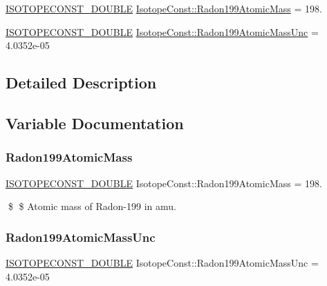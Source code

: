 \begin{DoxyCompactItemize}
\item 
\mbox{\hyperlink{group___isotope_const-_macros_ga8f45a7272ce02c0b4c65c44636ed719a}{I\+S\+O\+T\+O\+P\+E\+C\+O\+N\+S\+T\+\_\+\+D\+O\+U\+B\+LE}} \mbox{\hyperlink{group___isotope_const-_radon-_rn199_ga08ef0f195014e412578e8e9b1a482140}{Isotope\+Const\+::\+Radon199\+Atomic\+Mass}} = 198.
\item 
\mbox{\hyperlink{group___isotope_const-_macros_ga8f45a7272ce02c0b4c65c44636ed719a}{I\+S\+O\+T\+O\+P\+E\+C\+O\+N\+S\+T\+\_\+\+D\+O\+U\+B\+LE}} \mbox{\hyperlink{group___isotope_const-_radon-_rn199_ga126f8e40286b31ec6d8028e0fa4db247}{Isotope\+Const\+::\+Radon199\+Atomic\+Mass\+Unc}} = 4.\+0352e-\/05
\end{DoxyCompactItemize}


\subsection{Detailed Description}


\subsection{Variable Documentation}
\mbox{\label{group___isotope_const-_radon-_rn199_ga08ef0f195014e412578e8e9b1a482140}} 
\subsubsection{\texorpdfstring{Radon199\+Atomic\+Mass}{Radon199AtomicMass}}
{\footnotesize\ttfamily \mbox{\hyperlink{group___isotope_const-_macros_ga8f45a7272ce02c0b4c65c44636ed719a}{I\+S\+O\+T\+O\+P\+E\+C\+O\+N\+S\+T\+\_\+\+D\+O\+U\+B\+LE}} Isotope\+Const\+::\+Radon199\+Atomic\+Mass = 198.}

\$ \$ Atomic mass of Radon-\/199 in amu. \mbox{\label{group___isotope_const-_radon-_rn199_ga126f8e40286b31ec6d8028e0fa4db247}} 
\subsubsection{\texorpdfstring{Radon199\+Atomic\+Mass\+Unc}{Radon199AtomicMassUnc}}
{\footnotesize\ttfamily \mbox{\hyperlink{group___isotope_const-_macros_ga8f45a7272ce02c0b4c65c44636ed719a}{I\+S\+O\+T\+O\+P\+E\+C\+O\+N\+S\+T\+\_\+\+D\+O\+U\+B\+LE}} Isotope\+Const\+::\+Radon199\+Atomic\+Mass\+Unc = 4.\+0352e-\/05}

